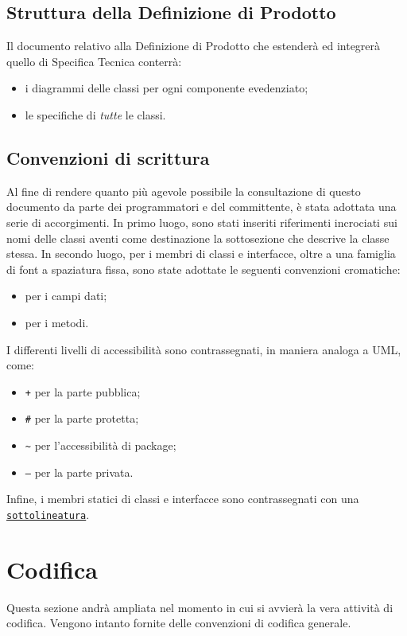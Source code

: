{\subsection{Struttura della Definizione di Prodotto}
Il documento relativo alla Definizione di Prodotto che estenderà ed integrerà quello di Specifica Tecnica conterrà:
\begin{itemize}
\item i diagrammi delle classi per ogni componente evedenziato;
\item le specifiche di \textit{tutte} le classi.
\end{itemize}

\subsection{Convenzioni di scrittura}
Al fine di rendere quanto più agevole possibile la consultazione di questo documento da parte dei programmatori e del committente, è stata adottata una serie di accorgimenti. In primo luogo, sono stati inseriti riferimenti incrociati sui nomi delle classi aventi come destinazione la sottosezione che descrive la classe stessa.
In secondo luogo, per i membri di classi e interfacce, oltre a una famiglia di font a spaziatura fissa, sono state adottate le seguenti convenzioni cromatiche:
\begin{itemize}[noitemsep,nolistsep]
\item {} per i campi dati;
\item {} per i metodi.
\end{itemize}
I differenti livelli di accessibilità sono contrassegnati, in maniera analoga a UML, come:
\begin{itemize}
  \item \texttt{\ttfamily +} per la parte pubblica;
  \item \texttt{\ttfamily \#} per la parte protetta;
  \item \texttt{\ttfamily \textasciitilde} per  l'accessibilità di package;
  \item \texttt{\ttfamily --} per la parte privata.
\end{itemize}

Infine, i membri statici di classi e interfacce sono contrassegnati con una \underline{\texttt{sottolineatura}}.

\newpage
\section{Codifica}
Questa sezione andrà ampliata nel momento in cui si avvierà la vera attività di codifica. Vengono intanto fornite delle convenzioni di codifica generale.

}
